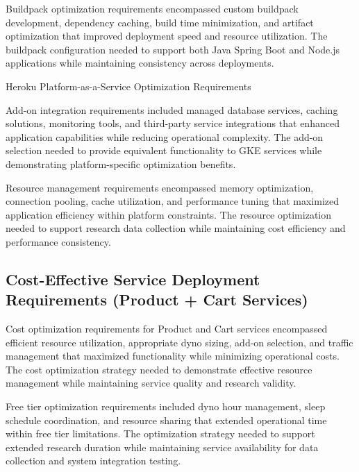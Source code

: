 Buildpack optimization requirements encompassed custom buildpack development, dependency caching, build time minimization, and artifact optimization that improved deployment speed and resource utilization. The buildpack configuration needed to support both Java Spring Boot and Node.js applications while maintaining consistency across deployments.

\begin{table}[H]
\centering
\caption{Heroku Platform-as-a-Service Optimization Requirements}
\label{tab:heroku-optimization}
\end{table}

Add-on integration requirements included managed database services, caching solutions, monitoring tools, and third-party service integrations that enhanced application capabilities while reducing operational complexity. The add-on selection needed to provide equivalent functionality to GKE services while demonstrating platform-specific optimization benefits.

Resource management requirements encompassed memory optimization, connection pooling, cache utilization, and performance tuning that maximized application efficiency within platform constraints. The resource optimization needed to support research data collection while maintaining cost efficiency and performance consistency.

\subsection{Cost-Effective Service Deployment Requirements (Product + Cart Services)}

Cost optimization requirements for Product and Cart services encompassed efficient resource utilization, appropriate dyno sizing, add-on selection, and traffic management that maximized functionality while minimizing operational costs. The cost optimization strategy needed to demonstrate effective resource management while maintaining service quality and research validity.

Free tier optimization requirements included dyno hour management, sleep schedule coordination, and resource sharing that extended operational time within free tier limitations. The optimization strategy needed to support extended research duration while maintaining service availability for data collection and system integration testing.

